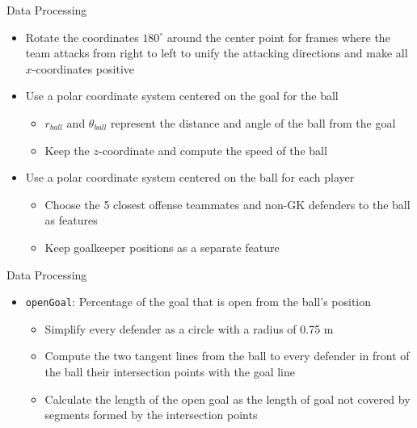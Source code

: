 \documentclass[
  11pt,
  ignorenonframetext,
]{beamer}
\providecommand{\tightlist}{%
  \setlength{\itemsep}{0pt}\setlength{\parskip}{0pt}}
\begin{document}
\begin{frame}{Data Processing}
\protect{}\label{data-processing-1}
\begin{itemize}
\tightlist
\item
  Rotate the coordinates \(180^\circ\) around the center point for
  frames where the team attacks from right to left to unify the
  attacking directions and make all \(x\)-coordinates positive
\item
  Use a polar coordinate system centered on the goal for the ball

  \begin{itemize}
  \tightlist
  \item
    \(r_{ball}\) and \(\theta_{ball}\) represent the distance and angle
    of the ball from the goal
  \item
    Keep the \(z\)-coordinate and compute the speed of the ball
  \end{itemize}
\item
  Use a polar coordinate system centered on the ball for each player

  \begin{itemize}
  \tightlist
  \item
    Choose the 5 closest offense teammates and non-GK defenders to the
    ball as features
  \item
    Keep goalkeeper positions as a separate feature
  \end{itemize}
\end{itemize}
\end{frame}

\begin{frame}[fragile]{Data Processing}
\protect{}\label{data-processing-2}
\begin{itemize}
\tightlist
\item
  \texttt{openGoal}: Percentage of the goal that is open from the ball's
  position

  \begin{itemize}
  \tightlist
  \item
    Simplify every defender as a circle with a radius of 0.75 m
  \item
    Compute the two tangent lines from the ball to every defender in
    front of the ball their intersection points with the goal line
  \item
    Calculate the length of the open goal as the length of goal not
    covered by segments formed by the intersection points
  \end{itemize}
\end{itemize}
\end{frame}
\end{document}
